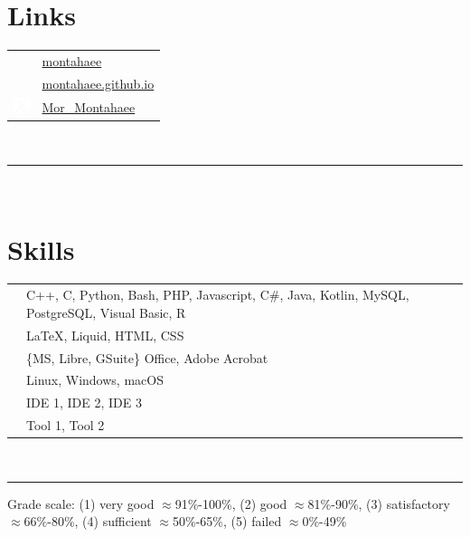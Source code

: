 \documentclass[twoside]{article}
\begin{document}
{\begin{minipage}[t][\textheight-2\fboxsep-2\fboxrule][t]{\dimexpr0.40\textwidth-2\fboxrule-2\fboxsep\relax}
        \section*{\large Links}
        \begin{tabular}{cl}
            \faGithub{}   & \href{https://github.com/montahaee}{montahaee} \\
            \faGlobe{} & \href{https://montahaee.github.io/}{montahaee.github.io} \\
            \includegraphics[width=1.25em]{icon-twitterx-500.png} &  \href{https://x.com/Mor_Montahaee}{Mor\_Montahaee} \\
        \end{tabular}
        \vspace{10pt} \\
        \rule{\linewidth}{0.4pt} \\
        \section*{\large Skills}
        \begin{tabularx}{\textwidth}{cY}
            \faCode{}        & C++, C, Python, Bash, PHP, Javascript, C\#, Java, Kotlin, MySQL, PostgreSQL, Visual Basic, R \\
            \faPen*{}        & \LaTeX, Liquid, HTML, CSS \\
            \faFont{}        & \{MS, Libre, GSuite\} Office, Adobe Acrobat \\
            \faCogs{}        & Linux, Windows, macOS \\
            \faLaptopCode{}  & IDE 1, IDE 2, IDE 3 \\
            \faToolbox{}     & Tool 1, Tool 2 
        \end{tabularx}
        \vspace{1pt} \\
        \rule{\linewidth}{0.4pt}
        \vfill
        {\tiny Grade scale: (1) very good $\approx$91\%-100\%, (2) good $\approx$81\%-90\%, (3) satisfactory $\approx$66\%-80\%, (4) sufficient $\approx$50\%-65\%, (5) failed $\approx$0\%-49\%}
    \end{minipage}
}
\end{document}
